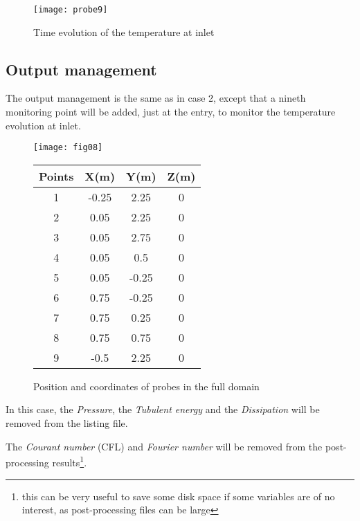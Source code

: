 \begin{figure}[h!]
\begin{center}
\texttt{[image: probe9]}
\caption{Time evolution of the temperature at inlet}
\label{figp9_e3}
\end{center}
\end{figure}


        \subsection{Output management}

The output management is the same as in case 2, except that a nineth monitoring
point will be added, just at the entry, to monitor the temperature evolution at inlet.

\begin{figure}[htp]
\parbox{8cm}{%
\centerline{\texttt{[image: fig08]}}}
\parbox{7cm}{%
\begin{center}
\begin{tabular}{|c|c|c|c|}
\hline
Points & X(m) & Y(m) & Z(m)\\
\hline
1 & -0.25 & 2.25 & 0 \\
\hline
2 & 0.05 & 2.25 & 0 \\
\hline
3 & 0.05 & 2.75 & 0 \\
\hline
4 & 0.05 & 0.5 & 0 \\
\hline
5 & 0.05 & -0.25 & 0 \\
\hline
6 & 0.75 & -0.25 & 0 \\
\hline
7 & 0.75 & 0.25 & 0 \\
\hline
8 & 0.75 & 0.75 & 0 \\
\hline
9 & -0.5 & 2.25 & 0 \\
\hline
\end{tabular}
\end{center}
}
\caption{Position and coordinates of probes in the full domain}
\label{figante32}
\end{figure}

In this case, the {\itshape Pressure}, the {\itshape Tubulent energy} and the
{\itshape Dissipation} will be removed from the listing file.

The {\itshape Courant number} (CFL) and {\itshape Fourier number} will be
removed from the
post-processing results\footnote{this can be very useful to save some disk space
if some variables are of no interest, as post-processing files can be large}.

